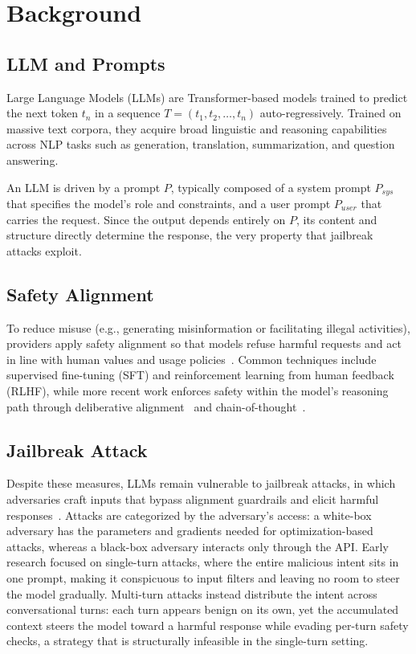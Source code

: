 \section{Background}
\label{sec:background}

\subsection{LLM and Prompts}

Large Language Models (LLMs) are Transformer-based models trained to predict the next token $t_n$ in a sequence $T = (t_1, t_2, \dots, t_n)$ auto-regressively.
Trained on massive text corpora, they acquire broad linguistic and reasoning capabilities across NLP tasks such as generation, translation, summarization, and question answering.

An LLM is driven by a prompt $P$, typically composed of a system prompt $P_{sys}$ that specifies the model's role and constraints, and a user prompt $P_{user}$ that carries the request.
Since the output depends entirely on $P$, its content and structure directly determine the response, the very property that jailbreak attacks exploit.

\subsection{Safety Alignment}

To reduce misuse (e.g., generating misinformation or facilitating illegal activities), providers apply safety alignment so that models refuse harmful requests and act in line with human values and usage policies~\cite{instructgpt}.
Common techniques include supervised fine-tuning (SFT) and reinforcement learning from human feedback (RLHF), while more recent work enforces safety within the model's reasoning path through deliberative alignment~\cite{deliberative} and chain-of-thought~\cite{CoT}.

\subsection{Jailbreak Attack}

Despite these measures, LLMs remain vulnerable to jailbreak attacks, in which adversaries craft inputs that bypass alignment guardrails and elicit harmful responses~\cite{jailbroken}.
Attacks are categorized by the adversary's access: a white-box adversary has the parameters and gradients needed for optimization-based attacks, whereas a black-box adversary interacts only through the API.
Early research focused on single-turn attacks, where the entire malicious intent sits in one prompt, making it conspicuous to input filters and leaving no room to steer the model gradually.
Multi-turn attacks instead distribute the intent across conversational turns: each turn appears benign on its own, yet the accumulated context steers the model toward a harmful response while evading per-turn safety checks, a strategy that is structurally infeasible in the single-turn setting.

